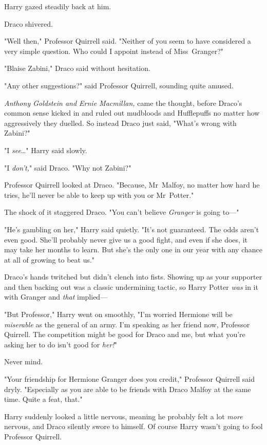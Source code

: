 Harry gazed steadily back at him.

Draco shivered.

"Well then," Professor Quirrell said. "Neither of you seem to have considered a
very simple question. Who could I appoint instead of Miss~Granger?"

"Blaise Zabini," Draco said without hesitation.

"Any other suggestions?" said Professor Quirrell, sounding quite amused.

\emph{Anthony Goldstein and Ernie Macmillan,} came the thought, before Draco's
common sense kicked in and ruled out mudbloods and Hufflepuffs no matter how
aggressively they duelled. So instead Draco just said, "What's wrong with
Zabini?"

"I \emph{see}…" Harry said slowly.

"I \emph{don't,}" said Draco. "Why not Zabini?"

Professor Quirrell looked at Draco. "Because, Mr~Malfoy, no matter how hard he
tries, he'll never be able to keep up with you or Mr~Potter."

The shock of it staggered Draco. "You can't believe \emph{Granger} is going
to---"

"He's gambling on her," Harry said quietly. "It's not guaranteed. The odds
aren't even good. She'll probably never give us a good fight, and even if she
does, it may take her months to learn. But she's the only one in our year with
any chance at all of growing to beat us."

Draco's hands twitched but didn't clench into fists. Showing up as your
supporter and then backing out was a classic undermining tactic, so Harry
Potter \emph{was} in it with Granger and \emph{that} implied---

"But Professor," Harry went on smoothly, "I'm worried Hermione will be
\emph{miserable} as the general of an army. I'm speaking as her friend now,
Professor Quirrell. The competition might be good for Draco and me, but what
you're asking her to do isn't good for \emph{her!}"

Never mind.

"Your friendship for Hermione Granger does you credit," Professor Quirrell said
dryly. "Especially as you are able to be friends with Draco Malfoy at the same
time. Quite a feat, that."

Harry suddenly looked a little nervous, meaning he probably felt a lot
\emph{more} nervous, and Draco silently swore to himself. Of course Harry
wasn't going to fool Professor Quirrell.

